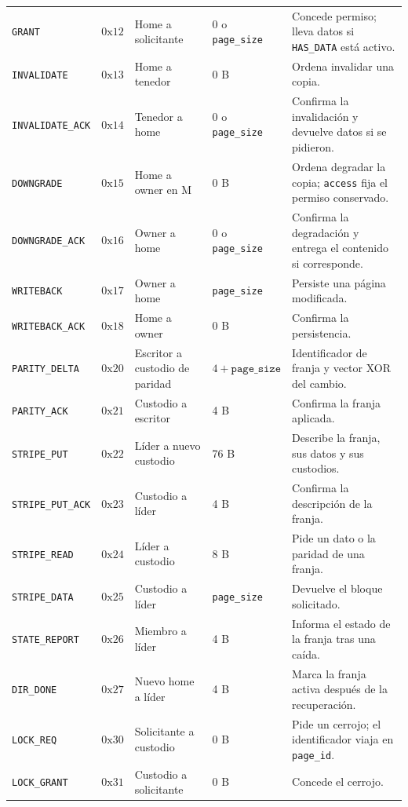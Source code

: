 {\begin{xltabular}{\linewidth}{l l P{3.55cm} P{1.75cm} Y}
\texttt{GRANT} & $0\text{x}12$ & Home a solicitante & 0 o \texttt{page\_size} & Concede permiso; lleva datos si \texttt{HAS\_DATA} está activo. \\
\texttt{INVALIDATE} & $0\text{x}13$ & Home a tenedor & 0 B & Ordena invalidar una copia. \\
\texttt{INVALIDATE\_ACK} & $0\text{x}14$ & Tenedor a home & 0 o \texttt{page\_size} & Confirma la invalidación y devuelve datos si se pidieron. \\
\texttt{DOWNGRADE} & $0\text{x}15$ & Home a owner en M & 0 B & Ordena degradar la copia; \texttt{access} fija el permiso conservado. \\
\texttt{DOWNGRADE\_ACK} & $0\text{x}16$ & Owner a home & 0 o \texttt{page\_size} & Confirma la degradación y entrega el contenido si corresponde. \\
\texttt{WRITEBACK} & $0\text{x}17$ & Owner a home & \texttt{page\_size} & Persiste una página modificada. \\
\texttt{WRITEBACK\_ACK} & $0\text{x}18$ & Home a owner & 0 B & Confirma la persistencia. \\
\texttt{PARITY\_DELTA} & $0\text{x}20$ & Escritor a custodio de paridad & $4 + \texttt{page\_size}$ & Identificador de franja y vector XOR del cambio. \\
\texttt{PARITY\_ACK} & $0\text{x}21$ & Custodio a escritor & 4 B & Confirma la franja aplicada. \\
\texttt{STRIPE\_PUT} & $0\text{x}22$ & Líder a nuevo custodio & 76 B & Describe la franja, sus datos y sus custodios. \\
\texttt{STRIPE\_PUT\_ACK} & $0\text{x}23$ & Custodio a líder & 4 B & Confirma la descripción de la franja. \\
\texttt{STRIPE\_READ} & $0\text{x}24$ & Líder a custodio & 8 B & Pide un dato o la paridad de una franja. \\
\texttt{STRIPE\_DATA} & $0\text{x}25$ & Custodio a líder & \texttt{page\_size} & Devuelve el bloque solicitado. \\
\texttt{STATE\_REPORT} & $0\text{x}26$ & Miembro a líder & 4 B & Informa el estado de la franja tras una caída. \\
\texttt{DIR\_DONE} & $0\text{x}27$ & Nuevo home a líder & 4 B & Marca la franja activa después de la recuperación. \\
\texttt{LOCK\_REQ} & $0\text{x}30$ & Solicitante a custodio & 0 B & Pide un cerrojo; el identificador viaja en \texttt{page\_id}. \\
\texttt{LOCK\_GRANT} & $0\text{x}31$ & Custodio a solicitante & 0 B & Concede el cerrojo. \\

\end{xltabular}}
